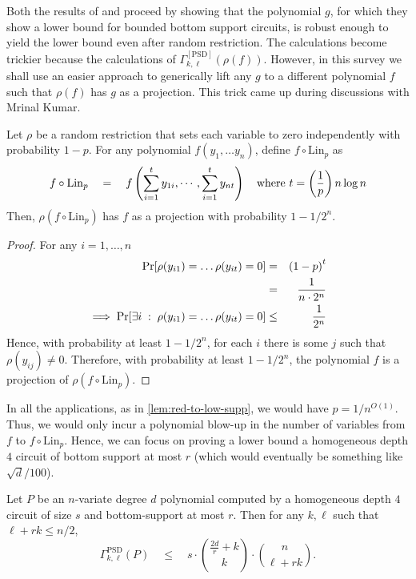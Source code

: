 Both the results of \cite{KLSS} and \cite{KS14} proceed by showing that the polynomial $g$, for which they show a lower bound for bounded bottom support circuits, is robust enough to yield the lower bound even after random restriction. 
The calculations become trickier because the calculations of $\Gamma^{[\mathrm{PSD}]}_{k,\ell}(\rho(f))$. 
However, in this survey we shall use an easier approach to generically lift any $g$ to a different polynomial $f$ such that $\rho(f)$ has $g$ as a projection. 
This trick came up during discussions with Mrinal Kumar. 

\begin{lemma}\label{lem:lin-transform-trick}
Let $\rho$ be a random restriction that sets each variable to zero independently with probability $1 - p$. 
For any polynomial $f(y_1,\dots y_n)$, define $f \circ \mathrm{Lin}_p$ as
\[
f \circ \mathrm{Lin}_p \quad = \quad f\left(\sum_{i=1}^t y_{1i}, \cdots, \sum_{i=1}^t y_{nt}\right)\quad \text{where $t = \left(\frac{1}{p}\right) n \log n$}
\]
Then, $\rho(f \circ \mathrm{Lin}_p)$ has $f$ as a projection with probability $1 - 1/2^{n}$. 
\end{lemma}
\begin{proof} For any $i = 1, \dots, n$
\begin{eqnarray*}
\quad \Pr[\rho(y_{i1}) = \dots \rho(y_{it}) = 0 ] & = & \left(1 - p\right)^t\\ 
& = & \frac{1}{n\cdot 2^n}\\
\implies \Pr[\exists i\;:\;\rho(y_{i1}) = \dots \rho(y_{it}) = 0 ]  & \leq  & \frac{1}{2^n} 
\end{eqnarray*}
Hence, with probability at least $1 - 1/2^n$, for each $i$ there is some $j$ such that $\rho(y_{ij}) \neq 0$. 
Therefore, with probability at least $1 - 1/2^n$, the polynomial $f$ is a projection of $\rho(f \circ \mathrm{Lin}_p)$. \end{proof}

In all the applications, as in \autoref{lem:red-to-low-supp}, we would have $p = 1/n^{O(1)}$. 
Thus, we would only incur a polynomial blow-up in the number of variables from $f$ to $f\circ \mathrm{Lin}_p$. 
Hence, we can focus on proving a lower bound  a homogeneous depth $4$ circuit of bottom support at most $r$ (which would eventually be something like $\sqrt{d}/100$). 

\begin{lemma}\label{lem:upper-bound-low-supp}
Let $P$ be an $n$-variate degree $d$ polynomial computed by a homogeneous depth $4$ circuit of size $s$ and bottom-support at most $r$. 
Then for any $k,\ell$ such that $\ell + rk \leq n/2$, 
\[
\Gamma^{\mathrm{PSD}}_{k,\ell}(P) \quad \leq \quad s \cdot \binom{\frac{2d}{r}+k}{k}\cdot \binom{n}{\ell+rk}. 
\]
\end{lemma}

